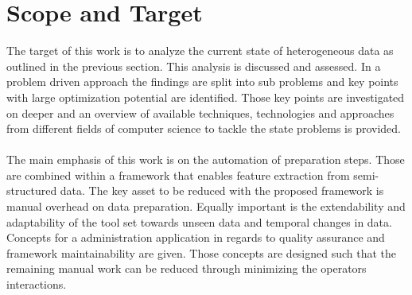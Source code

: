\section{Scope and Target\label{sec:scope}}
The target of this work is to analyze the current state of heterogeneous data as outlined in the previous section. This analysis is discussed and assessed. In a problem driven approach the findings are split into sub problems and key points with large optimization potential are identified. Those key points are investigated on deeper and an overview of available techniques, technologies and approaches from different fields of computer science to tackle the state problems is provided.
\\\\
The main emphasis of this work is on the automation of preparation steps. Those are combined within a framework that enables feature extraction from semi-structured data. The key asset to be reduced with the proposed framework is manual overhead on data preparation. Equally important is the extendability and adaptability of the tool set towards unseen data and temporal changes in data. Concepts for a administration application in regards to quality assurance and framework maintainability are given. Those concepts are designed such that the remaining manual work can be reduced through minimizing the operators interactions. 

